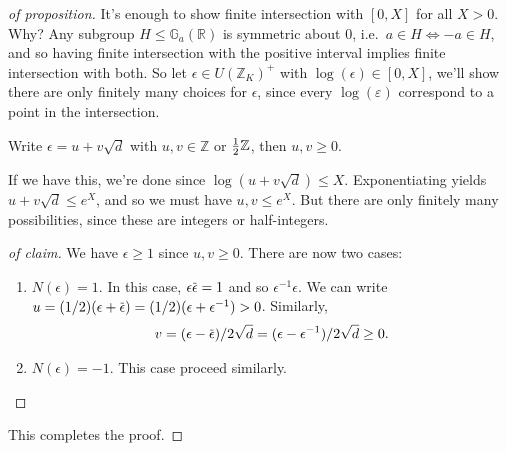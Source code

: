 \begin{proof}[of proposition]

It's enough to show finite intersection with \([0, X]\) for all \(X>0\).
Why? Any subgroup \(H\leq {\mathbb{G}}_a({\mathbb{R}})\) is symmetric
about 0, i.e.~\(a\in H \iff -a\in H\), and so having finite intersection
with the positive interval implies finite intersection with both. So let
\(\epsilon \in U({\mathbb{Z}}_K)^+\) with
\(\log( \epsilon) \in [0, X]\), we'll show there are only finitely many
choices for \(\epsilon\), since every \(\log(\varepsilon)\) correspond
to a point in the intersection.

\begin{claim}

Write \(\epsilon = u + v \sqrt{d}\) with \(u,v \in {\mathbb{Z}}\) or
\({1\over 2}{\mathbb{Z}}\), then \(u, v \geq 0\).

\end{claim}

If we have this, we're done since \(\log( u + v \sqrt{d}) \leq X\).
Exponentiating yields \(u + v\sqrt {d} \leq e^X\), and so we must have
\(u, v \leq e^X\). But there are only finitely many possibilities, since
these are integers or half-integers.

\begin{proof}[of claim]

We have \(\epsilon \geq 1\) since \(u, v \geq 0\). There are now two
cases:

\begin{enumerate}
\def\labelenumi{\arabic{enumi}.}
\item
  \(N( \epsilon) = 1\). In this case,
  \(\epsilon \mkern 1.5mu\overline{\mkern-1.5mu\epsilon \mkern-1.5mu}\mkern 1.5mu= 1\)
  and so \(\epsilon ^{-1} \epsilon\). We can write
  \(u = (1/2)( \epsilon + \mkern 1.5mu\overline{\mkern-1.5mu\epsilon\mkern-1.5mu}\mkern 1.5mu) = (1/2)(\epsilon + \epsilon ^{-1} ) > 0\).
  Similarly,
  \begin{align*} 
    v = (\epsilon - \mkern 1.5mu\overline{\mkern-1.5mu\epsilon\mkern-1.5mu}\mkern 1.5mu)/2 \sqrt{d} = (\epsilon - \epsilon ^{-1} ) / 2 \sqrt{d} \geq 0
    .\end{align*}
\item
  \(N(\epsilon) = -1\). This case proceed similarly.
\end{enumerate}

\end{proof}

This completes the proof.

\end{proof}

